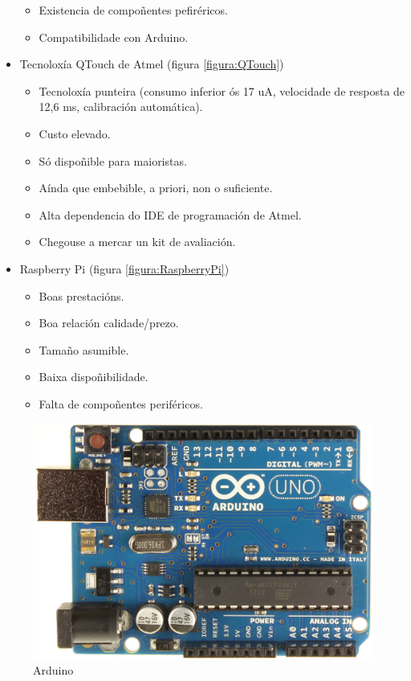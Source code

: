 \begin{itemize}
\begin{itemize}
          \item Existencia de compoñentes pefiréricos.
          \item Compatibilidade con Arduino.
         \end{itemize}
   \item Tecnoloxía QTouch de Atmel \cite{QTouch} (figura \ref{figura:QTouch})
         \begin{itemize}
          \item Tecnoloxía punteira (consumo inferior ós 17 uA, velocidade de
                resposta de 12,6 ms, calibración automática).
          \item Custo elevado.
          \item Só dispoñible para maioristas.
          \item Aínda que embebible, a priori, non o suficiente.
          \item Alta dependencia do IDE de programación de Atmel.
          \item Chegouse a mercar un kit de avaliación.
         \end{itemize}
   \item Raspberry Pi \cite{RaspberryPi} (figura \ref{figura:RaspberryPi})
         \begin{itemize}
          \item Boas prestacións.
          \item Boa relación calidade/prezo.
          \item Tamaño asumible.
          \item Baixa dispoñibilidade.
          \item Falta de compoñentes periféricos.
         \end{itemize}
  \end{itemize}

  \begin{figure}[htbp]
   \centering
   \includegraphics[scale=0.1,keepaspectratio=true]{./imagenes/arduino.jpg}
   \caption{Arduino}
   \label{figura:Arduino}
  \end{figure}

